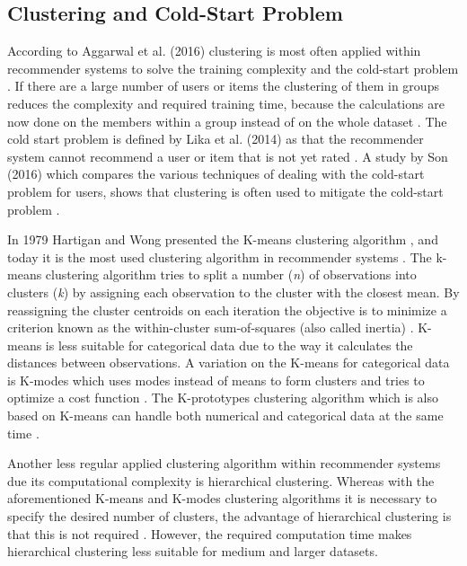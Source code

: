 \subsection{Clustering and Cold-Start Problem}
\label{sec:ccs}
According to Aggarwal et al. (2016) clustering is most often applied within recommender systems to solve the training complexity and the cold-start problem \cite{aggarwal2016recommender}.
If there are a large number of users or items the clustering of them in groups reduces the complexity and required training time, because the calculations are now done on the members within a group instead of on the whole dataset \cite{aggarwal2016content}.
The cold start problem is defined by Lika et al. (2014) as that the recommender system cannot recommend a user or item that is not yet rated \cite{lika2014facing}.
A study by Son (2016) which compares the various techniques of dealing with the cold-start problem for users, shows that clustering is often used to mitigate the cold-start problem \cite{son2016dealing}.

In 1979 Hartigan and Wong presented the K-means clustering algorithm \cite{hartigan1979algorithm}, and today it is the most used clustering algorithm in recommender systems \cite{aggarwal2016recommender}.
The k-means clustering algorithm tries to split a number (\textit{n}) of observations into clusters (\textit{k}) by assigning each observation to the cluster with the closest mean.
By reassigning the cluster centroids on each iteration the objective is to minimize a criterion known as the within-cluster sum-of-squares (also called inertia) \cite{mackay2003example}. 
K-means is less suitable for categorical data due to the way it calculates the distances between observations.
A variation on the K-means for categorical data is K-modes which uses modes instead of means to form clusters and tries to optimize a cost function \cite{huang1997clustering, huang1998extensions}.
The K-prototypes clustering algorithm which is also based on K-means can handle both numerical and categorical data at the same time \cite{huang1997clustering}.

Another less regular applied clustering algorithm within recommender systems due its computational complexity is hierarchical clustering.
Whereas with the aforementioned K-means and K-modes clustering algorithms it is necessary to specify the desired number of clusters, the advantage of hierarchical clustering is that this is not required \cite{rokach2005clustering}.
However, the required computation time makes hierarchical clustering less suitable for medium and larger datasets. 

